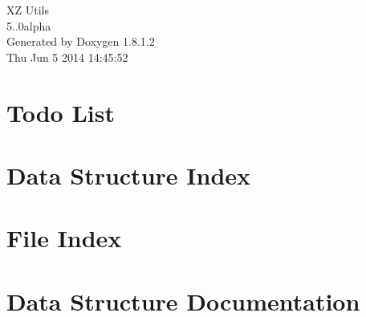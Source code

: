 \documentclass{book}
\begin{document}
\begin{titlepage}
\vspace*{7cm}
\begin{center}
{\Large X\-Z Utils \\[1ex]\large 5..\-0alpha }\\
\vspace*{1cm}
{\large Generated by Doxygen 1.8.1.2}\\
\vspace*{0.5cm}
{\small Thu Jun 5 2014 14:45:52}\\
\end{center}
\end{titlepage}
\clearemptydoublepage
{}
\tableofcontents
\clearemptydoublepage
{}
\chapter{Todo List}
\label{todo}

\chapter{Data Structure Index}

\chapter{File Index}

\chapter{Data Structure Documentation}















































\end{document}
